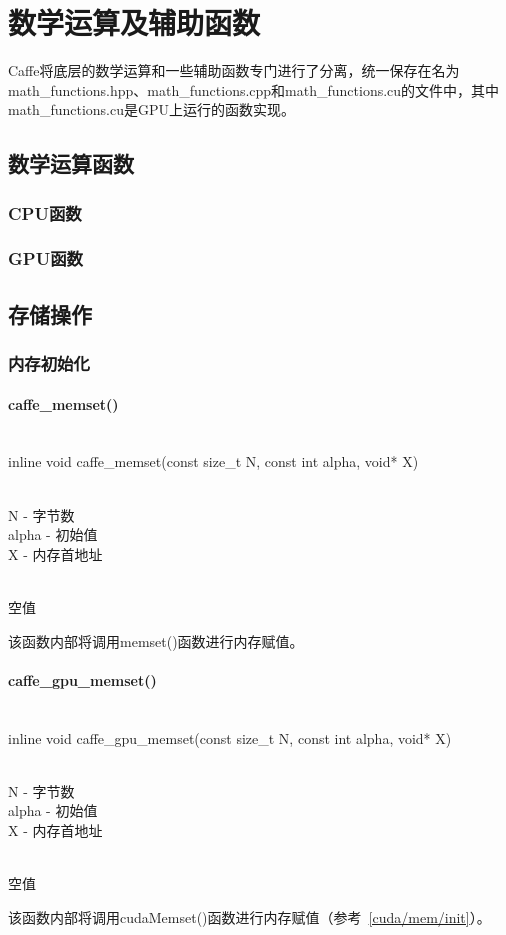 \chapter{数学运算及辅助函数}
Caffe将底层的数学运算和一些辅助函数专门进行了分离，统一保存在名为math\_functions.hpp、math\_functions.cpp和math\_functions.cu的文件中，其中math\_functions.cu是GPU上运行的函数实现。
\section{数学运算函数}
\subsection{CPU函数}
\subsection{GPU函数}
\section{存储操作}
\subsection{内存初始化}\label{math/mem/init}
\subsubsection{caffe\_memset()}
\begin{cnfrmfunc}
   \item{}\\
     inline void caffe\_memset(const size\_t N, const int alpha, void* X)
   \item{}\\
     N - 字节数\\
     alpha - 初始值\\
     X - 内存首地址
   \item{}\\
     空值
\end{cnfrmfunc}
该函数内部将调用memset()函数进行内存赋值。
\subsubsection{caffe\_gpu\_memset()}
\begin{cnfrmfunc}
   \item{}\\
     inline void caffe\_gpu\_memset(const size\_t N, const int alpha, void* X)
   \item{}\\
     N - 字节数\\
     alpha - 初始值\\
     X - 内存首地址
   \item{}\\
     空值
\end{cnfrmfunc}
该函数内部将调用cudaMemset()函数进行内存赋值（参考~\ref{cuda/mem/init}）。
